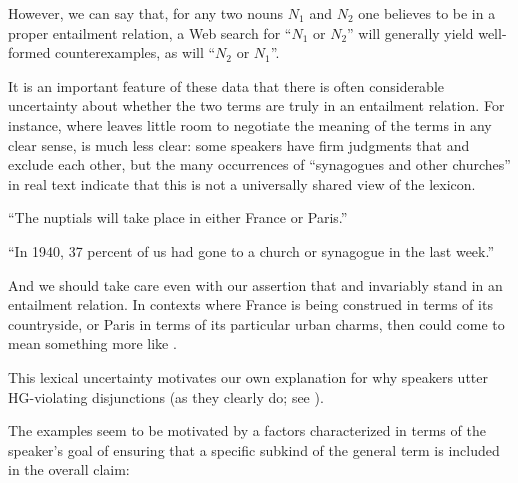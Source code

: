 \documentclass{article}
\begin{document}
\begin{examples}
\item However, we can say that, for any two nouns $N_{1}$ and $N_{2}$
  one believes to be in a proper entailment relation, a Web search for
  ``$N_{1}$ or $N_{2}$'' will generally yield well-formed
  counterexamples, as will ``$N_{2}$ or $N_{1}$''.%

\item\label{exclusive} It is an important feature of these data that
  there is often considerable uncertainty about whether the two terms
  are truly in an entailment relation. For instance, where
   leaves little room to negotiate the
  meaning of the terms in any clear sense,
   is much less clear: some
  speakers have firm judgments that  and 
  exclude each other, but the many occurrences of ``synagogues and
  other churches'' in real text indicate that this is not a
  universally shared view of the lexicon.

  \begin{examples}
  \item\label{franceorparis} ``The nuptials will take place in either
    France or Paris.''
  \item\label{churchorsynagogue} ``In 1940, 37 percent of us had gone
    to a church or synagogue in the last week.''
  \end{examples}

\item And we should take care even with our assertion that
   and  invariably stand in an entailment
  relation. In contexts where France is being construed in terms of
  its countryside, or Paris in terms of its particular urban charms,
  then  could come to mean something more like
  .

\item This lexical uncertainty motivates our own explanation for why
  speakers utter HG-violating disjunctions (as they clearly do; see
  ).

\item The examples seem to be motivated by a factors characterized in
  terms of the speaker's goal of ensuring that a specific subkind of
  the general term is included in the overall claim:


\end{examples}
\end{document}
